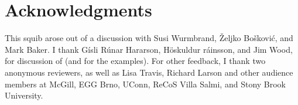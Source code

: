 \documentclass[output=paper]{langsci/langscibook}
\begin{document}
\section*{Acknowledgments}

This squib arose out of a discussion with Susi Wurmbrand, \v{Z}eljko Bo\v{s}kovi\'c, and Mark Baker. I thank G\'isli R\'unar Har{\dh}arson, H\"oskuldur {\TH}r\'ainsson, and Jim Wood, for discussion of  (and for the examples). For other feedback, I thank two anonymous reviewers, as well as Lisa Travis, Richard Larson and other audience members at McGill, EGG Brno, UConn, ReCoS Villa Salmi, and Stony Brook University.

\sloppy
\printbibliography[heading=subbibliography,notkeyword=this]
\end{document}
